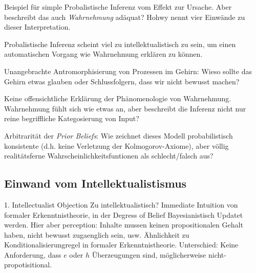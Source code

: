 \documentclass[11pt, handout]{beamer}
\begin{document}
\begin{frame}
  Beispiel für simple Probalistische Inferenz vom Effekt zur
  Ursache. Aber beschreibt das auch \emph{Wahrnehmung} adäquat? Hohwy
  nennt vier Einwände zu dieser Interpretation.  \footnotesize
  \begin{description}[<+->]
  \item[Einwand 1] Probalistische Inferenz scheint viel zu
    intellektualistisch zu sein, um einen automatischen Vorgang wie
    Wahrnehmung erklären zu können.
  \item[Einwand 2] Unangebrachte Antromorphisierung von Prozessen im
    Gehirn: Wieso sollte das Gehirn etwas glauben oder Schlussfolgern,
    dass wir nicht bewusst machen?
  \item[Einwand 3] Keine offensichtliche Erklärung der Phänomenologie
    von Wahrnehmung. Wahrnehmung fühlt sich wie etwas an, aber
    beschreibt die Inferenz nicht nur reine begriffliche Kategosierung
    von Input?
  \item[Einwand 4] Arbitrarität der \emph{Prior Beliefs}: Wie zeichnet
    dieses Modell probabilistisch konsistente (d.h. keine Verletzung
    der Kolmogorov-Axiome), aber völlig realitätsferne
    Wahrscheinlichkeitsfuntionen als schlecht/falsch aus?
  \end{description}
\end{frame}

\subsection{Einwand vom Intellektualistismus}

\begin{frame}
{\large 1. Intellectualist Objection}
  Zu intellektualistisch? Immediate Intuition von formaler
  Erkenntnistheorie, in der Degress of Belief Bayesianistisch Updatet
  werden. Hier aber perception: Inhalte mussen keinen propositionalen
  Gehalt haben, nicht bewusst zugaenglich sein, usw.  Ähnlichkeit zu
  Konditionalisierungregel in formaler Erkenntnistheorie. Unterschied:
  Keine Anforderung, dass $e$ oder $h$ Überzeugungen sind,
  möglicherweise nicht-propotisitional.
\end{frame}
\end{document}
